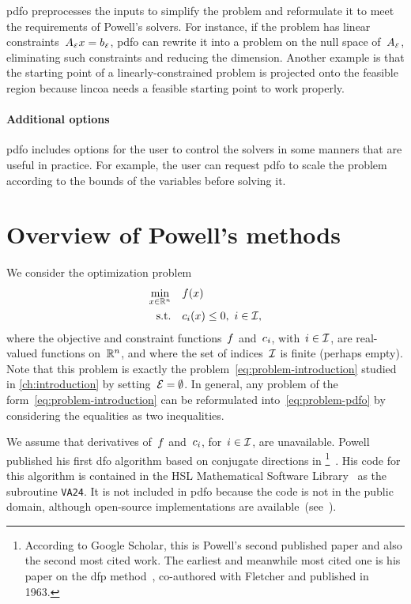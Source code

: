 \gls{pdfo} preprocesses the inputs to simplify the problem and reformulate it to meet the requirements of Powell's solvers.
For instance, if the problem has linear constraints~$A_{\scriptscriptstyle\ieq} \iter = b_{\scriptscriptstyle\ieq}$, \gls{pdfo} can rewrite it into a problem on the null space of~$A_{\scriptscriptstyle\mathcal{E}}$, eliminating such constraints and reducing the dimension.
Another example is that the starting point of a linearly-constrained problem is projected onto the feasible region because \gls{lincoa} needs a feasible starting point to work properly.

\paragraph{Additional options}

\gls{pdfo} includes options for the user to control the solvers in some manners that are useful in practice.
For example, the user can request \gls{pdfo} to scale the problem according to the bounds of the variables before solving it.

\section{Overview of Powell's  methods}
\label{sec:powell}

We consider the optimization problem
\begin{subequations}
    \label{eq:problem-pdfo}
    \begin{align}
        \min_{\iter \in \R^n}   & \quad \obj(\iter)\\
        \text{s.t.}             & \quad \con{i}(\iter) \le 0, ~ i \in \iub,
    \end{align}
\end{subequations}
where the objective and constraint functions~$f$ and~$c_{i}$, with~$i \in \mathcal{I}$, are real-valued functions on~$\mathbb{R}^n$, and where the set of indices~$\mathcal{I}$ is finite (perhaps empty).
Note that this problem is exactly the problem~\cref{eq:problem-introduction} studied in \cref{ch:introduction} by setting~$\mathcal{E} = \emptyset$.
In general, any problem of the form~\cref{eq:problem-introduction} can be reformulated into~\cref{eq:problem-pdfo} by considering the equalities as two inequalities.

We assume that derivatives of~$f$ and~$c_{i}$, for~$i \in \mathcal{I}$, are unavailable.
Powell published his first \gls{dfo} algorithm based on conjugate directions in \citeyear{Powell_1964}\footnote{According to Google Scholar, this is Powell's second published paper and also the second most cited work. The earliest and meanwhile most cited one is his paper on the \gls{dfp} method~\cite{Fletcher_Powell_1963}, co-authored with Fletcher and published in 1963.}~\cite{Powell_1964}.
His code for this algorithm is contained in the HSL Mathematical Software Library~\cite{HSL} as the subroutine \texttt{VA24}.
It is not included in \gls{pdfo} because the code is not in the public domain, although open-source implementations are available~(see~\cite[Fn.~4]{Conn_Scheinberg_Toint_1997b}).

